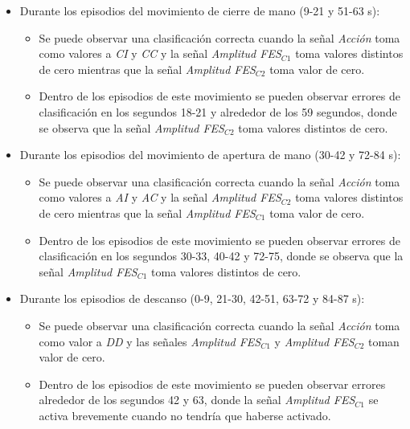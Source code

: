 \begin{itemize}
	\item Durante los episodios del movimiento de cierre de mano (9-21 y 51-63 s):
	
	\begin{itemize}
		\item Se puede observar una clasificación correcta cuando la señal \emph{Acción} toma como valores a \emph{CI} y \emph{CC} y la señal \emph{Amplitud FES$_{C1}$} toma valores distintos de cero mientras que la señal \emph{Amplitud FES$_{C2}$} toma valor de cero.
		\item Dentro de los episodios de este movimiento se pueden observar errores de clasificación en los segundos 18-21 y alrededor de los 59 segundos, donde se observa que la señal \emph{Amplitud FES$_{C2}$} toma valores distintos de cero.
	\end{itemize}
	
	\item Durante los episodios del movimiento de apertura de mano (30-42 y 72-84 s):
	
	\begin{itemize}
		\item Se puede observar una clasificación correcta cuando la señal \emph{Acción} toma como valores a \emph{AI} y \emph{AC} y la señal \emph{Amplitud FES$_{C2}$} toma valores distintos de cero mientras que la señal \emph{Amplitud FES$_{C1}$} toma valor de cero.
		\item Dentro de los episodios de este movimiento se pueden observar errores de clasificación en los segundos 30-33, 40-42 y 72-75, donde se observa que la señal \emph{Amplitud FES$_{C1}$} toma valores distintos de cero.
	\end{itemize}
		
	\item Durante los episodios de descanso (0-9, 21-30, 42-51, 63-72 y 84-87 s):
	\begin{itemize}
		\item Se puede observar una clasificación correcta cuando la señal \emph{Acción} toma como valor a \emph{DD} y las señales \emph{Amplitud FES$_{C1}$} y \emph{Amplitud FES$_{C2}$} toman valor de cero.
		\item Dentro de los episodios de este movimiento se pueden observar errores alrededor de los segundos 42 y 63, donde la señal \emph{Amplitud FES$_{C1}$} se activa brevemente cuando no tendría que haberse activado.
	\end{itemize}
\end{itemize}

